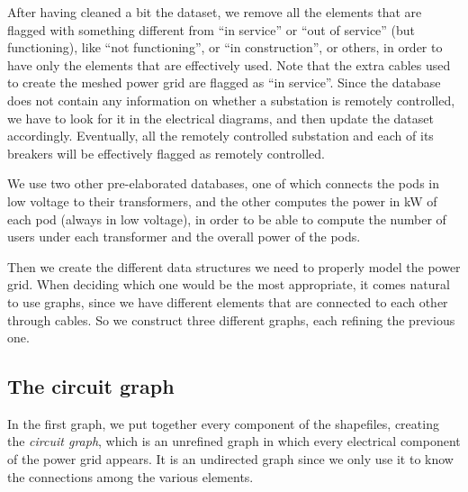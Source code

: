 After having cleaned a bit the dataset, we remove all the elements that are flagged with something different from ``in service'' or ``out of service'' (but functioning), like ``not functioning'', or ``in construction'', or others, in order to have only the elements that are effectively used. Note that the extra cables used to create the meshed power grid are flagged as ``in service''. Since the database does not contain any information on whether a substation is remotely controlled, we have to look for it in the electrical diagrams, and then update the dataset accordingly. Eventually, all the remotely controlled substation and each of its breakers will be effectively flagged as remotely controlled.

We use two other pre-elaborated databases, one of which connects the \acrshort{pod}s in low voltage to their transformers, and the other computes the power in kW of each \acrshort{pod} (always in low voltage), in order to be able to compute the number of users under each transformer and the overall power of the \acrshort{pod}s.

Then we create the different data structures we need to properly model the power grid. When deciding which one would be the most appropriate, it comes natural to use graphs, since we have different elements that are connected to each other through cables. So we construct three different graphs, each refining the previous one.



\subsection{The circuit graph}

In the first graph, we put together every component of the shapefiles, creating the \emph{circuit graph}, which is an unrefined graph in which every electrical component of the power grid appears. It is an undirected graph since we only use it to know the connections among the various elements.


